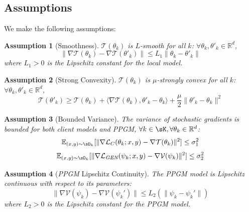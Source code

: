 \documentclass[lettersize,journal]{IEEEtran}
\newtheorem{assumption}{Assumption}
\begin{document}
\subsection{Assumptions}

We make the following assumptions:

\begin{assumption}[Smoothness]
\label{asm:1}
$\mathcal{T}(\theta_k)$ is $L$-smooth for all $k$: $\forall \theta_k, \theta'_k \in \mathbb{R}^d$,
\begin{equation}
    \|\nabla \mathcal{T}(\theta_k) - \nabla \mathcal{T}(\theta'_k)\| \leq L_1\|\theta_k - \theta'_k\|
\end{equation}
where $L_1 > 0$ is the Lipschitz constant for the local model.
\end{assumption}


\begin{assumption}[Strong Convexity]
\label{asm:2}
$\mathcal{T}(\theta_k)$ is $\mu$-strongly convex for all $k$: $\forall \theta_k, \theta'_k \in \mathbb{R}^d$,
\begin{equation}
    \mathcal{T}(\theta'_k) \geq \mathcal{T}(\theta_k) + \langle\nabla \mathcal{T}(\theta_k), \theta'_k - \theta_k\rangle + \frac{\mu}{2}\|\theta'_k - \theta_k\|^2
\end{equation}
\end{assumption}

\begin{assumption}[Bounded Variance]
\label{asm:3}
The variance of stochastic gradients is bounded for both client models and \emph{PPGM}, $\forall k \in \sK, \forall \theta_k \in \mathbb{R}^d$:
\begin{equation}
    \mathbb{E}_{(x,y)\sim\sD_k}[\|\nabla\mathcal{L}_C(\theta_k; x, y) - \nabla \mathcal{T}(\theta_k)\|^2] \leq \sigma_1^2
\end{equation}
\begin{equation}
    \mathbb{E}_{(x,y)\sim \sD_k}[\|\nabla\mathcal{L}_{\emph{GEN}}(\psi_k; x, y) - \nabla \mathcal{V}(\psi_k)\|^2] \leq \sigma_2^2
\end{equation}
\end{assumption}

\begin{assumption}[\emph{PPGM} Lipschitz Continuity]
\label{asm:4}
The \emph{PPGM} model is Lipschitz continuous with respect to its parameters:
\begin{equation}
    \|\nabla \mathcal{V}(\psi_k) - \nabla \mathcal{V}(\psi_k') \| \leq L_2(\|\psi_k - \psi_k'\|)
\end{equation}
where $L_2 > 0$ is the Lipschitz constant for the \emph{PPGM} model.
\end{assumption}
\end{document}
